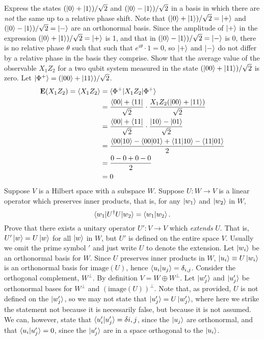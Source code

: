 Express the states $(\ket{0}+\ket{1})/\sqrt{2}$ and $(\ket{0}-\ket{1})/\sqrt{2}$ in a basis in which there are \textit{not} the same up to a relative phase shift.
\Soln Note that $(\ket{0} + \ket{1})/\sqrt{2} = \ket{+}$ and $(\ket{0}-\ket{1})/\sqrt{2}=\ket{-}$ are an orthonormal basis. Since the amplitude of $\ket{+}$ in the expression $(\ket{0} + \ket{1})/\sqrt{2} = \ket{+}$ is 1, and that in $(\ket{0} - \ket{1})/\sqrt{2} = \ket{-}$ is 0, there is no relative phase $\theta$ such that such that $e^{i\theta}\cdot 1 = 0$, so $\ket{+}$ and $\ket{-}$ do not differ by a relative phase in the basis they comprise.
Show that the average value of the observable $X_1Z_2$ for a two qubit system measured in the state $(\ket{00}+\ket{11})/\sqrt{2}$ is zero.
\Soln Let $\ket{\Phi^+} = (\ket{00}+\ket{11})/\sqrt{2}$.
\begin{align*}
    \mathbf{E}(X_1 Z_2) = \braket{X_1 Z_2} &= \braket{ \Phi^+|X_1 Z_2|\Phi^+} \\
    &=  \frac{\bra{00}+\bra{11}}{\sqrt{2}} \cdot \frac{X_1Z_2(\ket{00}+\ket{11})}{\sqrt{2}} \\
    &=  \frac{\bra{00}+\bra{11}}{\sqrt{2}}\cdot \frac{\ket{10}-\ket{01}}{\sqrt{2}} \\
    &= \frac{\braket{00|10} - \braket{00|01} + \braket{11|10} - \braket{11|01}}{2} \\
    &= \frac{0-0+0-0}{2} \\
    &= 0
\end{align*}
 Suppose $V$ is a Hilbert space with a subspace $W$.  Suppose $U : W\rightarrow V$ is a linear operator which preserves inner products, that is, for any $\ket{w_1}$ and $\ket{w_2}$ in $W$, $$\braket{w_1|U^\dagger U|w_2} = \braket{w_1|w_2}.$$  Prove that there exists a unitary operator $U': V\rightarrow V$ which \textit{extends} $U$.  That is, $U'\ket{w} = U\ket{w}$ for all $\ket{w}$ in $W$, but $U'$ is defined on the entire space $V$.  Usually we omit the prime symbol $'$ and just write $U$ to denote the extension.
\Soln
 Let $\ket{w_i}$ be an orthonormal basis for $W$.  Since $U$ preserves inner products in $W$, $\ket{u_i}\equiv U\ket{w_i}$ is an orthonormal basis for $\text{image}(U)$, hence $\braket{u_i|u_j} = \delta_{i,j}$.  Consider the orthogonal complement, $W^\perp$.  By definition $V = W \oplus W^\perp$.  Let $\ket{w_j'}$ and $\ket{u_j'}$ be orthonormal bases for $W^\perp$ and $\left( \mathrm{image}(U) \right)^\perp$.  Note that, as provided, $U$ is not defined on the $\ket{w_j'}$, so we may not state that \sout{$\ket{u_j'} = U\ket{w_j'}$}, where here we  strike the statement not because it is necessarily false, but because it is not assumed.  We can, however, state that $\braket{u_i'|u_j'} = \delta{i,j}$, since the $\ket{u_j}$ are orthonormal, and that $\braket{u_i|u_j'} = 0$, since the $\ket{u_j'}$ are in a space orthogonal to the $\ket{u_i}$.

